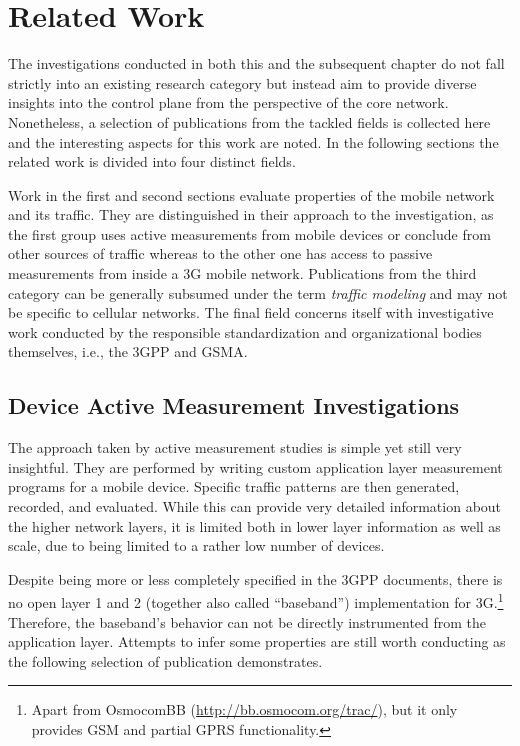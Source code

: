 \section{Related Work}
\label{c4:sec:relwork}

The investigations conducted in both this and the subsequent chapter do not fall strictly into an existing research category but instead aim to provide diverse insights into the control plane from the perspective of the core network. Nonetheless, a selection of publications from the tackled fields is collected here and the interesting aspects for this work are noted. In the following sections the related work is divided into four distinct fields.

Work in the first and second sections evaluate properties of the mobile network and its traffic. They are distinguished in their approach to the investigation, as the first group uses active measurements from mobile devices or conclude from other sources of traffic whereas to the other one has access to passive measurements from inside a \gls{3G} mobile network. Publications from the third category can be generally subsumed under the term \textit{traffic modeling} and may not be specific to cellular networks. The final field concerns itself with investigative work conducted by the responsible standardization and organizational bodies themselves, i.e., the \gls{3GPP} and \gls{GSMA}.


\subsection{Device Active Measurement Investigations}

The approach taken by active measurement studies is simple yet still very insightful. They are performed by writing custom application layer measurement programs for a mobile device. Specific traffic patterns are then generated, recorded, and evaluated. While this can provide very detailed information about the higher network layers, it is limited both in lower layer information as well as scale, due to being limited to a rather low number of devices.

Despite being more or less completely specified in the \gls{3GPP} documents, there is no open layer 1 and 2 (together also called ``baseband'') implementation for \gls{3G}.\footnote{Apart from OsmocomBB (\url{http://bb.osmocom.org/trac/}), but it only provides \gls{GSM} and partial \gls{GPRS} functionality.} Therefore, the baseband's behavior can not be directly instrumented from the application layer. Attempts to infer some properties are still worth conducting as the following selection of publication demonstrates.

